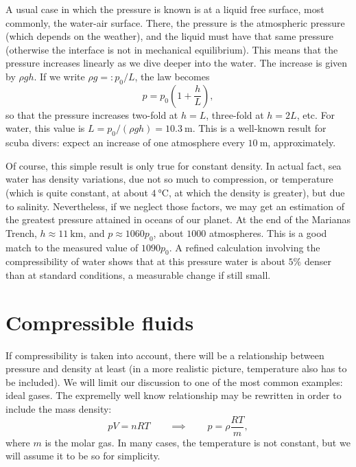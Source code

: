 A usual case in which the pressure is known is at a liquid free
surface, most commonly, the water-air surface. There, the pressure is
the atmospheric pressure (which depends on the weather), and the
liquid must have that same pressure (otherwise the interface is not in
mechanical equilibrium). This means that the pressure increases
linearly as we dive deeper into the water. The increase is given by
$\rho g h$. If we write $\rho g  =: p_0  / L $, the law becomes
\[
p= p_0 \left( 1 + \frac{h}{L} \right) ,
\]
so that the pressure increases two-fold at $h=L$, three-fold at
$h=2L$, etc. For water, this value is $L= p_0 / (\rho g h ) =
\SI{10.3}{\meter}$. This is a well-known result for scuba divers:
expect an increase of one atmosphere every $\SI{10}{\meter}$,
approximately.

Of course, this simple result is only true for constant density. In
actual fact, sea water has density variations, due not so much to
compression, or temperature (which is quite constant, at about
$\SI{4}{\celsius}$, at which the density is greater), but due to
salinity. Nevertheless, if we neglect those factors, we may get an
estimation of the greatest pressure attained in oceans of our planet.
At the end of the Marianas Trench, $h\approx\SI{11}{\kilo\meter}$, and
$p\approx 1060 p_0$, about $1000$ atmospheres. This is a good match to
the measured value of $1090 p_0$. A refined calculation involving the
compressibility of water shows that at this pressure water is about
$5\%$ denser than at standard conditions, a measurable change if still
small.



\section{Compressible fluids}

If compressibility is taken into account, there will be a relationship
between pressure and density at least (in a more realistic picture,
temperature also has to be included). We will limit our discussion to
one of the most common examples: ideal gases. The expremelly well know
relationship may be rewritten in order to include the mass density:
\begin{equation}
  \label{eq:ideal_gas_EOS}
  p V = n R T \qquad\implies\qquad p = \rho\frac{ R T}{m},
\end{equation}
where $m$ is the molar gas. In many cases, the temperature is not
constant, but we will assume it to be so for simplicity.

